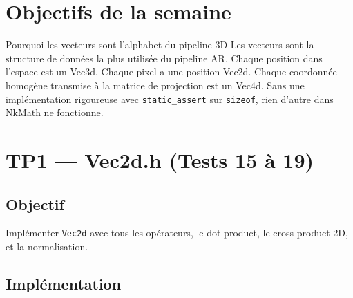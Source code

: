\documentclass[12pt,a4paper]{report}
\begin{document}
\section*{Objectifs de la semaine}

\begin{theorybox}{Pourquoi les vecteurs sont l'alphabet du pipeline 3D}
Les vecteurs sont la structure de données la plus utilisée du pipeline AR.
Chaque position dans l'espace est un Vec3d. Chaque pixel a une position
Vec2d. Chaque coordonnée homogène transmise à la matrice de projection
est un Vec4d. Sans une implémentation rigoureuse avec \texttt{static\_assert}
sur \texttt{sizeof}, rien d'autre dans NkMath ne fonctionne.
\end{theorybox}

\section{TP1 --- Vec2d.h (Tests 15 à 19)}

\subsection{Objectif}

Implémenter \texttt{Vec2d} avec tous les opérateurs, le dot product,
le cross product 2D, et la normalisation.

\subsection{Implémentation}
\end{document}
